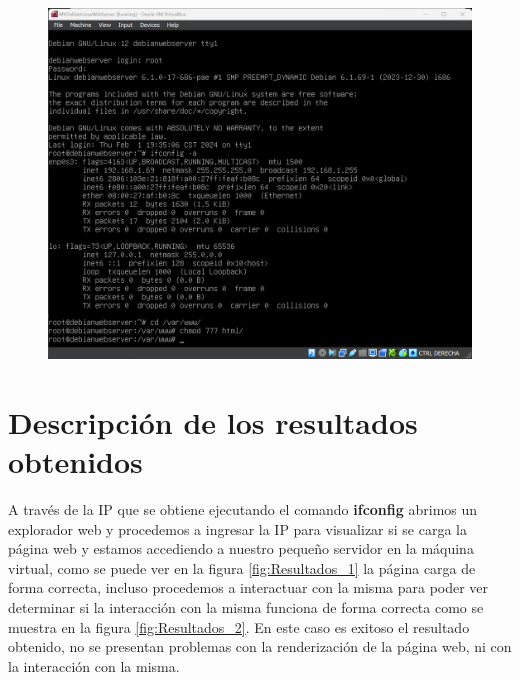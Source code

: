 \documentclass[12pt,a4paper]{article}
\begin{document}
\begin{figure}[H]
    \centering
    \includegraphics[width=1\linewidth]{M3_Virtualización_y_Contenedores/Tarea_2_Máquina_Virtual_Local/reporte/figuras/6-2_Carga_Sitio_Web_en_MV.png}
    \label{fig:Cargado_sitio_web_2}
\end{figure}


\section{Descripción de los resultados obtenidos}

A través de la IP que se obtiene ejecutando el comando \textbf{ifconfig} abrimos un explorador web y procedemos a ingresar la IP para visualizar si se carga la página web y estamos accediendo a nuestro pequeño servidor en la máquina virtual, como se puede ver en la figura \ref{fig:Resultados_1} la página carga de forma correcta, incluso procedemos a interactuar con la misma para poder ver determinar si la interacción con la misma funciona de forma correcta como se muestra en la figura \ref{fig:Resultados_2}. En este caso es exitoso el resultado obtenido, no se presentan problemas con la renderización de la página web, ni con la interacción con la misma.
\end{document}
